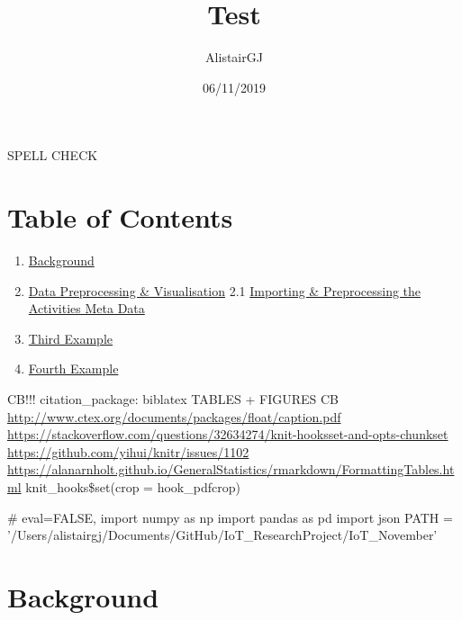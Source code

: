 \documentclass[11pt,]{article}
\title{Test}
\author{AlistairGJ}
\date{06/11/2019}
\newenvironment{Shaded}{\begin{snugshade}}{\end{snugshade}}
\newcommand{\CommentTok}[1]{\textcolor[rgb]{0.54,0.53,0.53}{#1}}
\newcommand{\ImportTok}[1]{\textcolor[rgb]{1.00,0.33,0.00}{#1}}
\newcommand{\NormalTok}[1]{\textcolor[rgb]{0.12,0.11,0.11}{#1}}
\newcommand{\OperatorTok}[1]{\textcolor[rgb]{0.12,0.11,0.11}{#1}}
\newcommand{\StringTok}[1]{\textcolor[rgb]{0.75,0.01,0.01}{#1}}
\providecommand{\tightlist}{%
  \setlength{\itemsep}{0pt}\setlength{\parskip}{0pt}}
\begin{document}
\maketitle

SPELL CHECK

\hypertarget{table-of-contents}{%
\section{Table of Contents}\label{table-of-contents}}

\begin{enumerate}
\def\labelenumi{\arabic{enumi}.}
\tightlist
\item
  \protect\hyperlink{Background}{Background}
\item
  \protect\hyperlink{Dataux5cux2520Preprocessingux5cux2520ux5cux26ux5cux2520Visualisation}{Data
  Preprocessing \& Visualisation} 2.1
  \protect\hyperlink{Importingux5cux2520ux5cux26ux5cux2520Preprocessingux5cux2520theux5cux2520Activitiesux5cux2520Metaux5cux2520Data}{Importing
  \& Preprocessing the Activities Meta Data}
\item
  \protect\hyperlink{third-example}{Third Example}
\item
  \protect\hyperlink{fourth-examplehttpwwwfourthexamplecom}{Fourth
  Example}
\end{enumerate}

CB!!! citation\_package: biblatex TABLES + FIGURES CB
\url{http://www.ctex.org/documents/packages/float/caption.pdf}
\url{https://stackoverflow.com/questions/32634274/knit-hooksset-and-opts-chunkset}
\url{https://github.com/yihui/knitr/issues/1102}
\url{https://alanarnholt.github.io/GeneralStatistics/rmarkdown/FormattingTables.html}
knit\_hooks\$set(crop = hook\_pdfcrop)

\begin{Shaded}
\begin{Highlighting}[]
\CommentTok{# eval=FALSE, }
\ImportTok{import}\NormalTok{ numpy }\ImportTok{as}\NormalTok{ np}
\ImportTok{import}\NormalTok{ pandas }\ImportTok{as}\NormalTok{ pd}
\ImportTok{import}\NormalTok{ json}
\NormalTok{PATH }\OperatorTok{=} \StringTok{'/Users/alistairgj/Documents/GitHub/IoT_ResearchProject/IoT_November'}
\end{Highlighting}
\end{Shaded}

\pagebreak

\hypertarget{background}{%
\section{Background}\label{background}}
\end{document}
